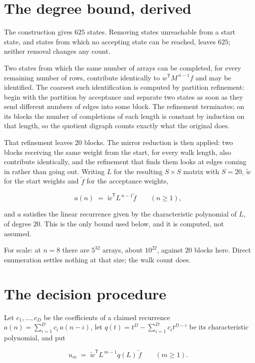 \documentclass[11pt]{article}
\theoremstyle{definition}
\begin{document}
\section{The degree bound, derived}

The construction gives $625$ states. Removing states unreachable from a start state, and states from which no accepting state can be reached, leaves $625$; neither removal changes any count.

Two states from which the same number of arrays can be completed, for every remaining number of rows, contribute identically to $w^{\mathsf T}M^{\,n-1}f$ and may be identified. The coarsest such identification is computed by partition refinement: begin with the partition by acceptance and separate two states as soon as they send different numbers of edges into some block. The refinement terminates; on its blocks the number of completions of each length is constant by induction on that length, so the quotient digraph counts exactly what the original does.

That refinement leaves $20$ blocks. The mirror reduction is then applied: two blocks receiving the same weight from the start, for every walk length, also contribute identically, and the refinement that finds them looks at edges coming in rather than going out. Writing $L$ for the resulting $S \times S$ matrix with $S = 20$, $\tilde w$ for the start weights and $\tilde f$ for the acceptance weights,

\[a(n) \;=\; \tilde w^{\mathsf T} L^{\,n-1} \tilde f \qquad (n \ge 1),\]

and $a$ satisfies the linear recurrence given by the characteristic polynomial of $L$, of degree $20$. This is the only bound used below, and it is computed, not assumed.

For scale: at $n = 8$ there are $5^{32}$ arrays, about $10^{22}$, against $20$ blocks here. Direct enumeration settles nothing at that size; the walk count does.

\section{The decision procedure}

Let $c_1,\dots,c_D$ be the coefficients of a claimed recurrence $a(n) = \sum_{i=1}^{D} c_i\,a(n-i)$, let $q(t) = t^{D} - \sum_{i=1}^{D} c_i t^{D-i}$ be its characteristic polynomial, and put

\[u_m \;=\; \tilde w^{\mathsf T} L^{\,m-1} q(L)\,\tilde f \qquad (m \ge 1).\]
\end{document}
